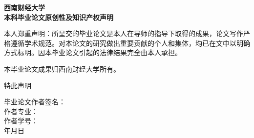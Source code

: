 \clearpage
\thispagestyle{empty}
\vspace*{1.5cm}
\begin{center}
    {\hwzhongsong\bfseries{} 西南财经大学}\\[0.8em]
    {\hwzhongsong\bfseries{} 本科毕业论文原创性及知识产权声明}
\end{center}

\vspace{1\baselineskip}

{\songti{}\setlength{\parindent}{2em}
\par 本人郑重声明：所呈交的毕业论文是本人在导师的指导下取得的成果，论文写作严格遵循学术规范。对本论文的研究做出重要贡献的个人和集体，均已在文中以明确方式标明。因本毕业论文引起的法律结果完全由本人承担。

\par 本毕业论文成果归西南财经大学所有。
}

\vspace{1\baselineskip}

{\songti{}\setlength{\parindent}{2em}
\par 特此声明
}

\vfill

{\songti{}
\hfill
\begin{minipage}{5cm}
    \raggedright
    毕业论文作者签名：\\[0.6em]
    作者专业：\\[0.6em]
    作者学号：\\[0.6em]
    \hspace{4em}年\hspace{2em}月\hspace{2em}日
\end{minipage}
}

\vspace{2cm}
\clearpage
